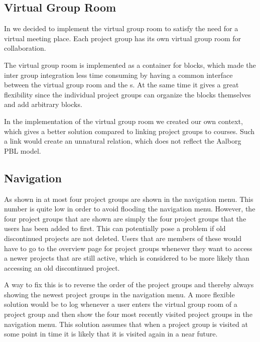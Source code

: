 \subsection{Virtual Group Room}
In  we decided to implement the virtual group room to satisfy the need for a virtual meeting place.
Each project group has its own virtual group room for collaboration. 

The virtual group room is implemented as a container for blocks, which made the inter group integration less time consuming by having a common interface between the virtual group room and the \detdeandrelaver{}s.
At the same time it gives a great flexibility since the individual project groups can organize the blocks themselves and add arbitrary blocks.

In the implementation of the virtual group room we created our own context, which gives a better solution compared to linking project groups to courses. 
Such a link would create an unnatural relation, which does not reflect the Aalborg PBL model.

\subsection{Navigation}
As shown in  at most four project groups are shown in the navigation menu.
This number is quite low in order to avoid flooding the navigation menu.
However, the four project groups that are shown are simply the four project groups that the users has been added to first.
This can potentially pose a problem if old discontinued projects are not deleted.
Users that are members of these would have to go to the overview page for project groups whenever they want to access a newer projects that are still active, which is considered to be more likely than accessing an old discontinued project.

A way to fix this is to reverse the order of the project groups and thereby always showing the newest project groups in the navigation menu.
A more flexible solution would be to log whenever a user enters the virtual group room of a project group and then show the four most recently visited project groups in the navigation menu.
This solution assumes that when a project group is visited at some point in time it is likely that it is visited again in a near future.


